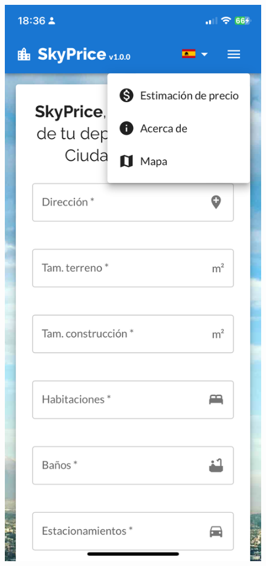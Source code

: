 \begin{figure}[H]
    \centering
    \begin{minipage}{0.45\textwidth}
        \centering
        \includegraphics[width=\textwidth]{imagenes/05-implementacion/interfaz-grafica/main-responsive.png}

\end{minipage}
\end{figure}
